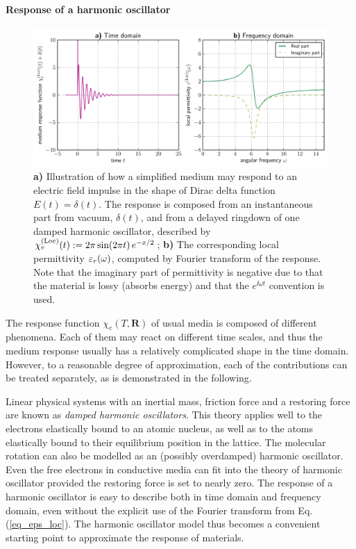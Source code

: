 \paragraph{Response of a harmonic oscillator} \label{chap_lorentzmedia} %
\begin{figure}[t] \caption{\textbf{a)} Illustration of how a simplified medium may respond to an electric field impulse in the shape of Dirac delta function  $E(t) = \delta(t)$. The response is composed from an instantaneous part from vacuum, $\delta(t)$, and from a delayed ringdown of one damped harmonic oscillator, described by $\chi_e^{\rm(Loc)}(t) := 2\pi \sin(2\pi t)\,e^{-x/2}$; \textbf{b)} The corresponding local permittivity $\varepsilon_r(\omega)$, computed by Fourier transform of the response. Note that the imaginary part of permittivity is negative due to that the material is lossy (absorbs energy) and that the $e^{\ii\omega t}$ convention is used.} \label{fg_oscillator_spectrum} \centering 
	\includegraphics[width=17cm]{img/oscillator_spectrum.pdf}
\end{figure}
The response function $\chi_e(T, \mathbf{R})$ of usual media is composed of different phenomena.  Each of them may react on different time scales, and thus the medium response usually has a relatively complicated shape in the time domain.  However, to a reasonable degree of approximation, each of the contributions can be treated separately, as is demonstrated in the following.

Linear physical systems with an inertial mass, friction force and a restoring force are known as \textit{damped harmonic oscillators}.  This theory applies well to the electrons elastically bound to an atomic nucleus, as well as to the atoms elastically bound to their equilibrium position in the lattice. The molecular rotation can also be modelled as an (possibly overdamped) harmonic oscillator. Even the free electrons in conductive media can fit into the theory of harmonic oscillator provided the restoring force is set to nearly zero. The response of a harmonic oscillator is easy to describe both in time domain and frequency domain, even without the explicit use of the Fourier transform from Eq. (\ref{eq_eps_loc}). The harmonic oscillator model thus becomes a convenient starting point to approximate the response of materials.

